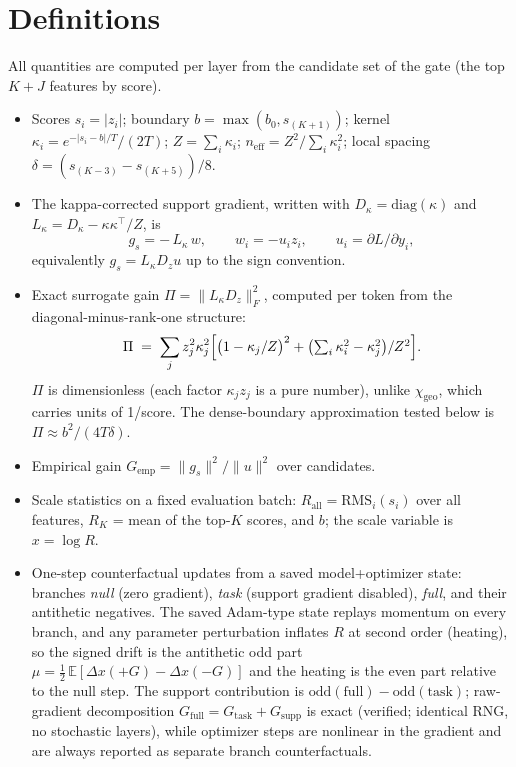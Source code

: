 \documentclass[11pt,a4paper]{article}
\newcommand{\neff}{n_{\mathrm{eff}}}
\newcommand{\chigeo}{\chi_{\mathrm{geo}}}
\newcommand{\Pisurr}{\Pi}
\begin{document}
\section{Definitions}

All quantities are computed per layer from the candidate set of the gate
(the top \(K{+}J\) features by score).

\begin{itemize}[leftmargin=1.4em]
\item Scores \(s_i = |z_i|\); boundary \(b = \max(b_0, s_{(K+1)})\); kernel
\(\kappa_i = e^{-|s_i - b|/T}/(2T)\); \(Z = \sum_i \kappa_i\);
\(\neff = Z^2 / \sum_i \kappa_i^2\); local spacing
\(\delta = (s_{(K-3)} - s_{(K+5)})/8\).
\item The kappa-corrected support gradient, written with
\(D_\kappa = \mathrm{diag}(\kappa)\) and
\(L_\kappa = D_\kappa - \kappa\kappa^{\top}/Z\), is
\[
g_s = -\,L_\kappa\, w,
\qquad w_i = -u_i z_i,
\qquad u_i = \partial L/\partial y_i ,
\]
equivalently \(g_s = L_\kappa D_z u\) up to the sign convention.
\item Exact surrogate gain
\(\Pisurr = \lVert L_\kappa D_z \rVert_F^2\), computed per token from the
diagonal-minus-rank-one structure:
\[
\Pisurr \;=\; \sum_j z_j^2 \kappa_j^2
\Bigl[\bigl(1 - \kappa_j/Z\bigr)^2 + \bigl(\textstyle\sum_i \kappa_i^2 -
\kappa_j^2\bigr)/Z^2\Bigr].
\]
\(\Pisurr\) is dimensionless (each factor \(\kappa_j z_j\) is a pure number),
unlike \(\chigeo\), which carries units of 1/score. The dense-boundary
approximation tested below is \(\Pisurr \approx b^2/(4T\delta)\).
\item Empirical gain \(G_{\mathrm{emp}} = \lVert g_s\rVert^2 / \lVert
u\rVert^2\) over candidates.
\item Scale statistics on a fixed evaluation batch:
\(R_{\mathrm{all}} = \mathrm{RMS}_i(s_i)\) over all features,
\(R_K\) = mean of the top-\(K\) scores, and \(b\); the scale variable is
\(x = \log R\).
\item One-step counterfactual updates from a saved model+optimizer state:
branches \emph{null} (zero gradient), \emph{task} (support gradient
disabled), \emph{full}, and their antithetic negatives. The saved Adam-type
state replays momentum on every branch, and any parameter perturbation
inflates \(R\) at second order (heating), so the signed drift is the
antithetic odd part
\(\mu = \tfrac12\,\mathbb{E}[\Delta x(+G) - \Delta x(-G)]\)
and the heating is the even part relative to the null step. The support
contribution is \(\mathrm{odd}(\mathrm{full}) - \mathrm{odd}(\mathrm{task})\);
raw-gradient decomposition \(G_{\mathrm{full}} = G_{\mathrm{task}} +
G_{\mathrm{supp}}\) is exact (verified; identical RNG, no stochastic layers),
while optimizer steps are nonlinear in the gradient and are always reported
as separate branch counterfactuals.
\end{itemize}
\end{document}
